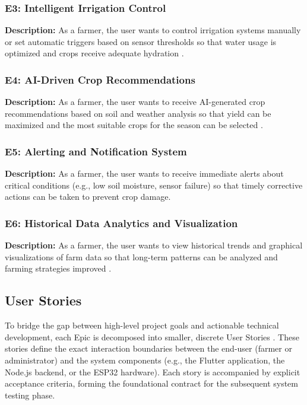 \subsubsection{E3: Intelligent Irrigation Control}

\textbf{Description:} As a farmer, the user wants to control 
irrigation systems manually or set automatic triggers based on sensor 
thresholds so that water usage is optimized and crops receive adequate 
hydration \cite{iotsmartag2024}.

\subsubsection{E4: AI-Driven Crop Recommendations}

\textbf{Description:} As a farmer, the user wants to receive 
AI-generated crop recommendations based on soil and weather analysis 
so that yield can be maximized and the most suitable crops for the 
season can be selected \cite{musanase2023data}.

\subsubsection{E5: Alerting and Notification System}

\textbf{Description:} As a farmer, the user wants to receive 
immediate alerts about critical conditions (e.g., low soil moisture, 
sensor failure) so that timely corrective actions can be taken to 
prevent crop damage.

\subsubsection{E6: Historical Data Analytics and Visualization}

\textbf{Description:} As a farmer, the user wants to view historical 
trends and graphical visualizations of farm data so that long-term 
patterns can be analyzed and farming strategies improved 
\cite{ncbi2023iot}.

\subsection{User Stories}

To bridge the gap between high-level project goals and actionable technical 
development, each Epic is decomposed into smaller, discrete User Stories 
\cite{ferreira2022userstories}. These stories define the exact interaction 
boundaries between the end-user (farmer or administrator) and the system 
components (e.g., the Flutter application, the Node.js backend, or the 
ESP32 hardware). Each story is accompanied by explicit acceptance criteria, 
forming the foundational contract for the subsequent system testing phase.


